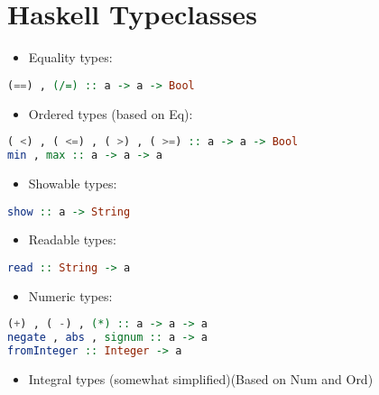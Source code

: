 \hypertarget{haskell-typeclasses}{%
\section{Haskell Typeclasses}\label{haskell-typeclasses}}

\begin{itemize}
\tightlist
\item
  Equality types:
\end{itemize}

\begin{lstlisting}[language=Haskell]
(==) , (/=) :: a -> a -> Bool
\end{lstlisting}

\begin{itemize}
\tightlist
\item
  Ordered types (based on Eq):
\end{itemize}

\begin{lstlisting}[language=Haskell]
( <) , ( <=) , ( >) , ( >=) :: a -> a -> Bool
min , max :: a -> a -> a
\end{lstlisting}

\begin{itemize}
\tightlist
\item
  Showable types:
\end{itemize}

\begin{lstlisting}[language=Haskell]
show :: a -> String
\end{lstlisting}

\begin{itemize}
\tightlist
\item
  Readable types:
\end{itemize}

\begin{lstlisting}[language=Haskell]
read :: String -> a
\end{lstlisting}

\begin{itemize}
\tightlist
\item
  Numeric types:
\end{itemize}

\begin{lstlisting}[language=Haskell]
(+) , ( -) , (*) :: a -> a -> a
negate , abs , signum :: a -> a
fromInteger :: Integer -> a
\end{lstlisting}

\begin{itemize}
\tightlist
\item
  Integral types (somewhat simplified)(Based on Num and Ord)
\end{itemize}

